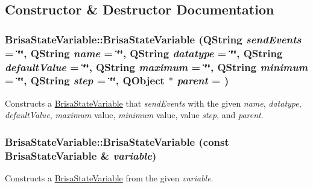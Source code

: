 \subsection{Constructor \& Destructor Documentation}
\hypertarget{classBrisaUpnp_1_1BrisaStateVariable_ad73ae0037a7032da20159fbc359a6a23}{
\subsubsection[{BrisaStateVariable}]{\setlength{\rightskip}{0pt plus 5cm}BrisaStateVariable::BrisaStateVariable (QString {\em sendEvents} = {\ttfamily \char`\"{}\char`\"{}}, \/  QString {\em name} = {\ttfamily \char`\"{}\char`\"{}}, \/  QString {\em datatype} = {\ttfamily \char`\"{}\char`\"{}}, \/  QString {\em defaultValue} = {\ttfamily \char`\"{}\char`\"{}}, \/  QString {\em maximum} = {\ttfamily \char`\"{}\char`\"{}}, \/  QString {\em minimum} = {\ttfamily \char`\"{}\char`\"{}}, \/  QString {\em step} = {\ttfamily \char`\"{}\char`\"{}}, \/  QObject $\ast$ {\em parent} = {})}}
\label{classBrisaUpnp_1_1BrisaStateVariable_ad73ae0037a7032da20159fbc359a6a23}


Constructs a \hyperlink{classBrisaUpnp_1_1BrisaStateVariable}{BrisaStateVariable} that {\itshape sendEvents\/} with the given {\itshape name\/}, {\itshape datatype\/}, {\itshape defaultValue\/}, {\itshape maximum\/} value, {\itshape minimum\/} value, value {\itshape step\/}, and {\itshape parent\/}. \hypertarget{classBrisaUpnp_1_1BrisaStateVariable_a30a706c2b604a395af735b5f90400e11}{
\subsubsection[{BrisaStateVariable}]{\setlength{\rightskip}{0pt plus 5cm}BrisaStateVariable::BrisaStateVariable (const {\bf BrisaStateVariable} \& {\em variable})}}
\label{classBrisaUpnp_1_1BrisaStateVariable_a30a706c2b604a395af735b5f90400e11}


Constructs a \hyperlink{classBrisaUpnp_1_1BrisaStateVariable}{BrisaStateVariable} from the given {\itshape variable\/}. 

